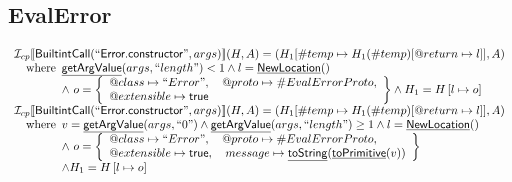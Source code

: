\documentclass{article}
\makeatletter
\newcommand{\SF}[1]{\mbox{\textsf{#1}}}
\newcommand{\wherec}[1]{{\rm where}\begin{array}[t]{l}#1\end{array}}
\newcommand{\I}{\mathcal{I}}
\newcommand{\set}[1]{\left\{\begin{array}{l}#1\end{array}\right\}}
\newcommand{\lbr}{\llbracket}
\newcommand{\rbr}{\rrbracket}
\newcommand{\hf}[1]{\underline{\sf #1}}
\newcommand{\varprop}[1]{@#1}
\newcommand{\vtrue}{\SF{true}}
\makeatother
\begin{document}
\subsection{EvalError}
\[
\begin{array}{l}
\I _{cp}\lbr \SF{BuiltintCall}(``\SF{Error.constructor}",args)\rbr(H,A)
  = (H_1[\#temp \mapsto H_1(\#temp)[@return \mapsto l]], A)\\
\quad\wherec{
  \hf{getArgValue}(args, ``length") < 1 
  \land l=\hf{NewLocation}()\\
  \land\ o = \set{
    \varprop{class}\mapsto ``Error", \quad
    \varprop{proto}\mapsto \#EvalErrorProto,\\
    \varprop{extensible}\mapsto \vtrue
    }
  \land H_1=H\left[l\mapsto o\right]\\
  }\\
  
\I _{cp}\lbr \SF{BuiltintCall}(``\SF{Error.constructor}",args)\rbr(H,A)
  = (H_1[\#temp \mapsto H_1(\#temp)[@return \mapsto l]], A)\\
\quad\wherec{
  v = \hf{getArgValue}(args, ``0") \land \hf{getArgValue}(args, ``length") \geq 1
  \land l=\hf{NewLocation}()\\
  \land\ o = \set{
    \varprop{class}\mapsto ``Error", \quad
    \varprop{proto}\mapsto \#EvalErrorProto,\\
    \varprop{extensible}\mapsto \vtrue,  \quad
    message \mapsto \hf{toString}(\hf{toPrimitive}(v)) 
    }\\
  \land H_1=H\left[l\mapsto o\right]
  }\\

\end{array}
\]
\end{document}

